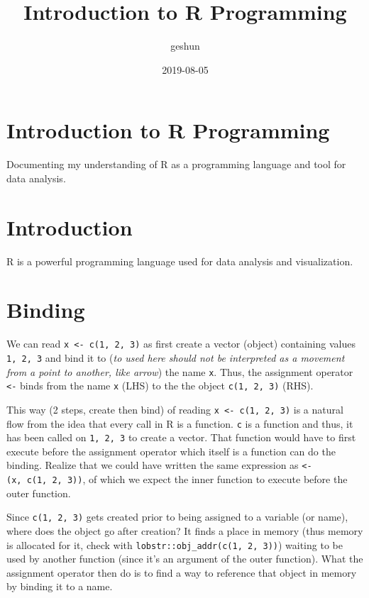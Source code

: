 \documentclass[]{book}
\title{Introduction to R Programming}
\author{geshun}
\date{2019-08-05}
\begin{document}
\maketitle

{
\setcounter{tocdepth}{1}
\tableofcontents
}
\hypertarget{introduction-to-r-programming}{%
\chapter*{Introduction to R Programming}\label{introduction-to-r-programming}}

Documenting my understanding of R as a programming language and tool for data analysis.

\hypertarget{introduction}{%
\chapter{Introduction}\label{introduction}}

R is a powerful programming language used for data analysis and visualization.

\hypertarget{binding}{%
\chapter{Binding}\label{binding}}

We can read \texttt{x\ \textless{}-\ c(1,\ 2,\ 3)} as first create a vector (object) containing values \texttt{1,\ 2,\ 3} and bind it to (\emph{to used here should not be interpreted as a movement from a point to another, like arrow}) the name \texttt{x}. Thus, the assignment operator \texttt{\textless{}-} binds from the name \texttt{x} (LHS) to the the object \texttt{c(1,\ 2,\ 3)} (RHS).

This way (2 steps, create then bind) of reading \texttt{x\ \textless{}-\ c(1,\ 2,\ 3)} is a natural flow from the idea that every call in R is a function. \texttt{c} is a function and thus, it has been called on \texttt{1,\ 2,\ 3} to create a vector. That function would have to first execute before the assignment operator which itself is a function can do the binding. Realize that we could have written the same expression as \texttt{\textasciigrave{}\textless{}-\textasciigrave{}(x,\ c(1,\ 2,\ 3))}, of which we expect the inner function to execute before the outer function.

Since \texttt{c(1,\ 2,\ 3)} gets created prior to being assigned to a variable (or name), where does the object go after creation? It finds a place in memory (thus memory is allocated for it, check with \texttt{lobstr::obj\_addr(c(1,\ 2,\ 3))}) waiting to be used by another function (since it's an argument of the outer function). What the assignment operator then do is to find a way to reference that object in memory by binding it to a name.
\end{document}
